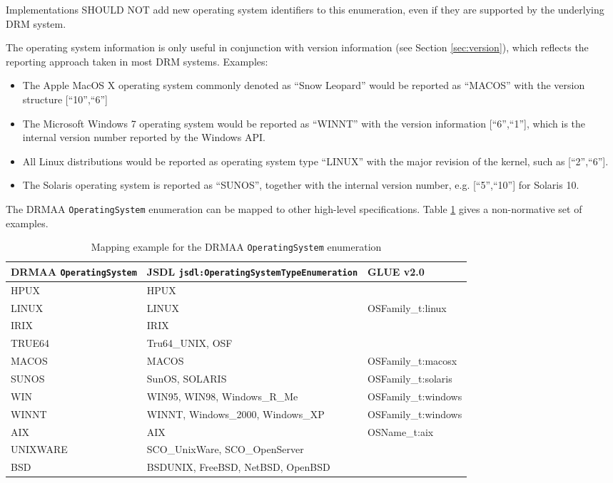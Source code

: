 \documentclass{article}
\newcommand{\h}[1]{\lstinline|#1|}
\begin{document}
Implementations SHOULD NOT add new operating system identifiers to this enumeration, even if they are supported by the underlying DRM system.

The operating system information is only useful in conjunction with version information (see Section \ref{sec:version}), which reflects the reporting approach taken in most DRM systems. Examples:

\begin{itemize}
	\item The Apple MacOS X operating system commonly denoted as \enquote{Snow Leopard} would be reported as \enquote{MACOS} with the version structure [\enquote{10},\enquote{6}]
    \item The Microsoft Windows 7 operating system would be reported as \enquote{WINNT} with the version information [\enquote{6},\enquote{1}], which is the internal version number reported by the Windows API.
    \item All Linux distributions would be reported as operating system type \enquote{LINUX} with the major revision of the kernel, such as [\enquote{2},\enquote{6}].
    \item The Solaris operating system is reported as \enquote{SUNOS}, together with the internal version number, e.g. [\enquote{5},\enquote{10}] for Solaris 10.
\end{itemize}

The DRMAA \h{OperatingSystem} enumeration can be mapped to other high-level specifications. Table \ref{tab:osmappings} gives a non-normative set of examples.

\begin{table}[ht]
\centering
\begin{tabularx}{\textwidth}{|l|X|l|}
\hline
DRMAA \h{OperatingSystem} & JSDL \h{jsdl:OperatingSystemTypeEnumeration} & GLUE v2.0 \\
\hline
HPUX	&	HPUX & \\
LINUX	& 	LINUX  & OSFamily\_t:linux \\
IRIX	&	IRIX &  \\
TRUE64 	&	Tru64\_UNIX, OSF & \\
MACOS 	&	MACOS & OSFamily\_t:macosx \\
SUNOS 	&	SunOS, SOLARIS & OSFamily\_t:solaris \\
WIN 	&	WIN95, WIN98, Windows\_R\_Me & OSFamily\_t:windows \\
WINNT 	&	WINNT, Windows\_2000, Windows\_XP & OSFamily\_t:windows \\
AIX 	&	AIX  &  OSName\_t:aix \\
UNIXWARE &	SCO\_UnixWare, SCO\_OpenServer & \\
BSD 	&	BSDUNIX, FreeBSD, NetBSD, OpenBSD & \\
\hline
\end{tabularx}
\caption{Mapping example for the DRMAA \h{OperatingSystem} enumeration}
\label{tab:osmappings}
\end{table}
\end{document}
